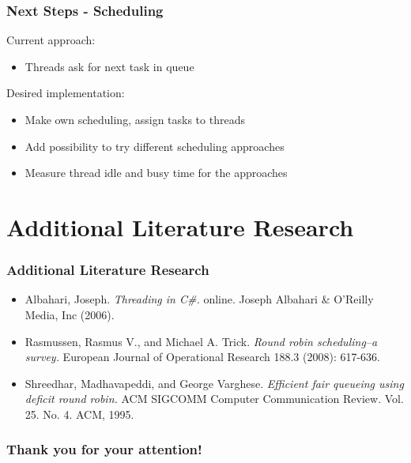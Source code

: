 \documentclass{beamer}
\begin{document}
\begin{frame}
	\frametitle{Next Steps - Scheduling}
	Current approach:  
	\begin{itemize}
		\item Threads ask for next task in queue
	\end{itemize}
	Desired implementation: 
	\begin{itemize}
		\item Make own scheduling, assign tasks to threads
		\item Add possibility to try different scheduling approaches
		\item Measure thread idle and busy time for the approaches
	\end{itemize}
\end{frame}

\section{Additional Literature Research}
    \begin{frame}
        \frametitle{Additional Literature Research}
        \begin{itemize}
            \item Albahari, Joseph. \emph{Threading in C\#.} online. Joseph Albahari \& O’Reilly Media, Inc (2006).
            \item Rasmussen, Rasmus V., and Michael A. Trick. \emph{Round robin scheduling–a survey.} European Journal of Operational Research 188.3 (2008): 617-636.
            \item Shreedhar, Madhavapeddi, and George Varghese. \emph{Efficient fair queueing using deficit round robin.} ACM SIGCOMM Computer Communication Review. Vol. 25. No. 4. ACM, 1995.
        \end{itemize}
    \end{frame}

    \begin{frame}
        \frametitle{Thank you for your attention!}
    \end{frame}
\end{document}
